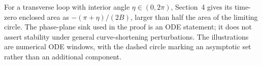 \begin{example}
For a transverse loop with interior angle $\eta\in(0,2\pi)$, Section~4 gives
its time-zero enclosed area as $-(\pi+\eta)/(2B)$, larger than half the area
of the limiting circle. The phase-plane sink used in the proof is an ODE
statement; it does not assert stability under general curve-shortening
perturbations. The illustrations are numerical ODE windows, with the dashed
circle marking an asymptotic set rather than an additional component.
\end{example}

